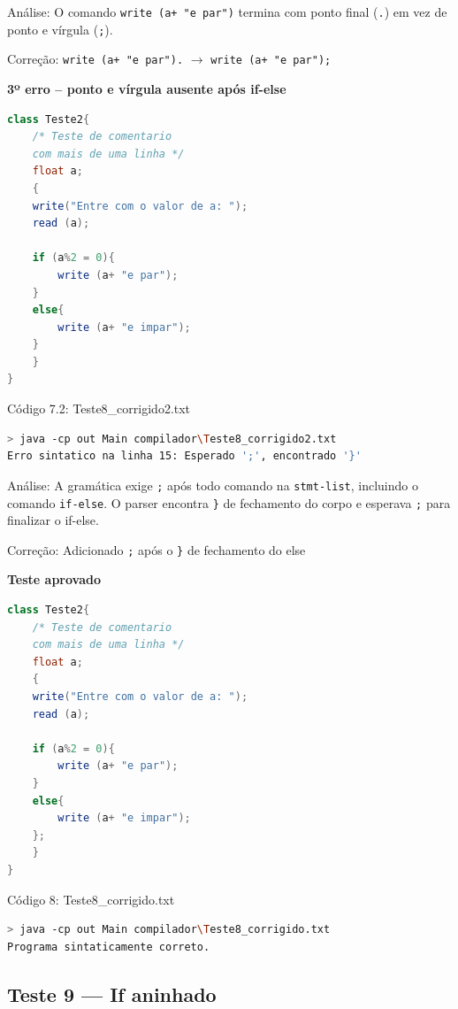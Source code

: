 \documentclass[12pt,a4paper]{article}
\begin{document}
Análise: O comando \texttt{write (a+ "e par")} termina com ponto final (\texttt{.}) em vez de ponto e vírgula (\texttt{;}).

Correção: \texttt{write (a+ "e par").} $\to$ \texttt{write (a+ "e par");}

\textbf{3º erro -- ponto e vírgula ausente após if-else}

\begin{lstlisting}[language=Java]
class Teste2{
    /* Teste de comentario
    com mais de uma linha */
    float a;
    {
    write("Entre com o valor de a: ");
    read (a);

    if (a%2 = 0){
        write (a+ "e par");
    }
    else{
        write (a+ "e impar");
    }
    }
}
\end{lstlisting}

Código 7.2: Teste8\_corrigido2.txt

\begin{lstlisting}[language=bash]
> java -cp out Main compilador\Teste8_corrigido2.txt
Erro sintatico na linha 15: Esperado ';', encontrado '}'
\end{lstlisting}

Análise: A gramática exige \texttt{;} após todo comando na \texttt{stmt-list}, incluindo o comando \texttt{if-else}. O parser encontra \texttt{\}} de fechamento do corpo e esperava \texttt{;} para finalizar o if-else.

Correção: Adicionado \texttt{;} após o \texttt{\}} de fechamento do else

\textbf{Teste aprovado}

\begin{lstlisting}[language=Java]
class Teste2{
    /* Teste de comentario
    com mais de uma linha */
    float a;
    {
    write("Entre com o valor de a: ");
    read (a);

    if (a%2 = 0){
        write (a+ "e par");
    }
    else{
        write (a+ "e impar");
    };
    }
}
\end{lstlisting}

Código 8: Teste8\_corrigido.txt

\begin{lstlisting}[language=bash]
> java -cp out Main compilador\Teste8_corrigido.txt
Programa sintaticamente correto.
\end{lstlisting}

\subsection{Teste 9 --- If aninhado}
\end{document}
